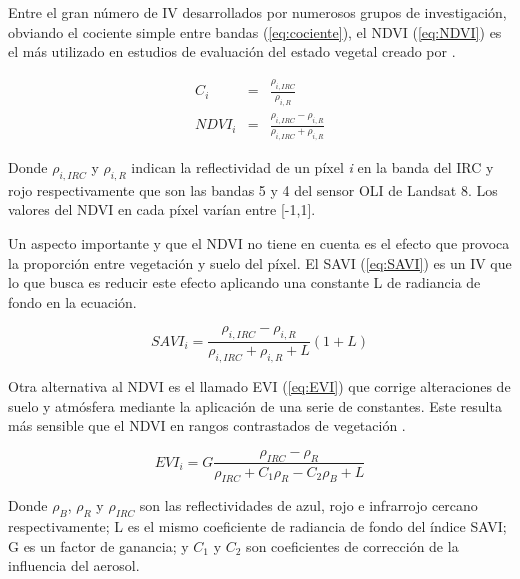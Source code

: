 Entre el gran número de \ac{IV} desarrollados por numerosos grupos de investigación, obviando el cociente simple entre bandas (\ref{eq:cociente}), el \ac{NDVI} (\ref{eq:NDVI}) es el más utilizado en estudios de evaluación del estado vegetal creado por \cite{rouse1974}.

\begin{eqnarray}\label{eq:cociente}
C_{i} & = & \frac{\rho_{i, IRC}}{\rho_{i, R}}\\
NDVI_{i} & = & \frac{\rho_{i, IRC}-\rho_{i, R}}{\rho_{i, IRC}+\rho_{i, R}}
\label{eq:NDVI}
\end{eqnarray}

Donde $\rho_{i, IRC}$ y $\rho_{i, R}$ indican la reflectividad de un píxel \textit{i} en la banda del IRC y rojo respectivamente que son las bandas 5 y 4 del sensor \ac{OLI} de Landsat 8. Los valores del \ac{NDVI} en cada píxel varían entre [-1,1].\Sep

Un aspecto importante y que el \ac{NDVI} no tiene en cuenta es el efecto que provoca la proporción entre vegetación y suelo del píxel. El \ac{SAVI} (\ref{eq:SAVI}) es un \ac{IV} que lo que busca es reducir este efecto aplicando una constante L de radiancia de fondo en la ecuación.

\begin{equation}
SAVI_{i}=\frac{\rho_{i, IRC}-\rho_{i, R}}{\rho_{i, IRC}+\rho_{i, R}+L}(1+L)
\label{eq:SAVI}
\end{equation}\Sep

Otra alternativa al \ac{NDVI} es el llamado \ac{EVI} (\ref{eq:EVI}) que corrige alteraciones de suelo y atmósfera mediante la aplicación de una serie de constantes. Este resulta más sensible que el \ac{NDVI} en rangos contrastados de vegetación \citep{chuvieco2002teledeteccion}.

\begin{equation}
EVI_{i}=G\frac{\rho_{IRC}-\rho_{R}}{\rho_{IRC}+C_{1}\rho_{R}-C_{2}\rho_{B}+L}
\label{eq:EVI}
\end{equation}

Donde $\rho_{B}$, $\rho_{R}$ y $\rho_{IRC}$ son las reflectividades de azul, rojo e infrarrojo cercano respectivamente; L es el mismo coeficiente de radiancia de fondo del índice \ac{SAVI}; G es un factor de ganancia; y $C_{1}$ y $C_{2}$ son coeficientes de corrección de la influencia del aerosol.